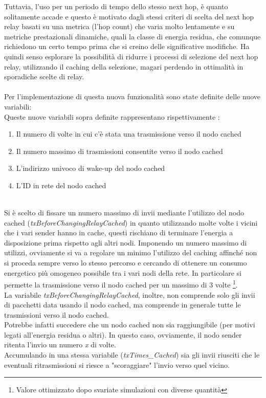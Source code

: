 Tuttavia, l'uso per un periodo di tempo dello stesso next hop, è quanto solitamente accade e questo è motivato dagli stessi criteri di scelta del next hop relay basati su una metrica (l'hop count) che varia molto lentamente e su metriche prestazionali dinamiche, quali la classe di energia residua, che comunque richiedono un certo tempo prima che si creino delle significative modifiche. Ha quindi senso esplorare la possibilità di ridurre i processi di selezione del next hop relay, utilizzando il caching della selezione, magari perdendo in ottimalità in sporadiche scelte di relay.\\
\\
Per l'implementazione di questa nuova funzionalità sono state definite delle nuove variabili:
\\
Queste nuove variabili sopra definite rappresentano rispettivamente :
\begin{enumerate}
    \item Il numero di volte in cui c'è stata una trasmissione verso il nodo cached 
    \item Il numero massimo di trasmissioni consentite verso il nodo cached
    \item L'indirizzo univoco di wake-up del nodo cached
    \item L'ID in rete del nodo cached
\end{enumerate}
\\
Si è scelto di fissare un numero massimo di invii mediante l'utilizzo del nodo cached (\textit{txBeforeChangingRelayCached}) in quanto utilizzando molte volte i vicini che i vari sender hanno in cache, questi rischiano di terminare l'energia a disposizione prima rispetto agli altri nodi. Imponendo un numero massimo di utilizzi, ovviamente si va a regolare un minimo l'utilizzo del caching affinché non si proceda sempre verso lo stesso percorso e cercando di ottenere un consumo energetico più omogeneo possibile tra i vari nodi della rete. In particolare si permette la trasmissione verso il nodo cached per un massimo di 3 volte \footnote{Valore ottimizzato dopo svariate simulazioni con diverse quantità}.\\

La variabile \textit{txBeforeChangingRelayCached}, inoltre, non comprende solo gli invii di pacchetti data usando il nodo cached, ma comprende in generale tutte le trasmissioni verso il nodo cached.\\
Potrebbe infatti succedere che un nodo cached non sia raggiungibile (per motivi legati all'energia residua o altri). In questo caso, ovviamente, il nodo sender ritenta l'invio un numero \textit{x} di volte.\\
Accumulando in una stessa variabile (\textit{txTimes\_Cached}) sia gli invii riusciti che le eventuali ritrasmissioni si riesce a "scoraggiare" l'invio verso quel vicino.\\

